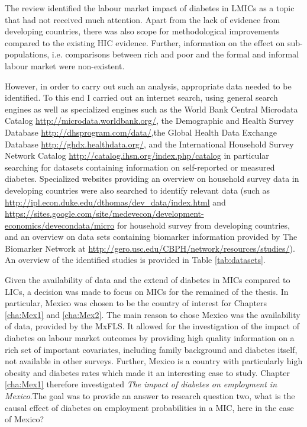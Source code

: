 The review identified the labour market impact of diabetes in \acp{LMIC} as a topic that had not received much attention. Apart from the lack of evidence from developing countries, there was also scope for methodological improvements compared to the existing \ac{HIC} evidence. Further, information on the effect on sub-populations, i.e. comparisons between rich and poor and the formal and informal labour market were non-existent.

However, in order to carry out such an analysis, appropriate data needed to be identified. To this end I carried out an internet search, using general search engines as well as specialized engines such as the World Bank Central Microdata Catalog  \url{http://microdata.worldbank.org/}, the Demographic and Health Survey Database \url{http://dhsprogram.com/data/},the Global Health Data Exchange Database \url{http://ghdx.healthdata.org/}, and the International Household Survey Network Catalog \url{http://catalog.ihsn.org/index.php/catalog} in particular searching for datasets containing information on self-reported or measured diabetes. Specialized websites providing an overview on household survey data in developing countries were also searched to identify relevant data (such as \url{http://ipl.econ.duke.edu/dthomas/dev_data/index.html} and \url{https://sites.google.com/site/medevecon/development-economics/devecondata/micro} for household survey from developing countries, and an overview on data sets containing biomarker information provided by The Biomarker Network at \url{http://gero.usc.edu/CBPH/network/resources/studies/}). An overview of the identified studies is provided in Table \ref{tab:datasets}.

Given the availability of data and the extend of diabetes in \acp{MIC} compared to \acp{LIC}, a decision was made to focus on \acp{MIC} for the remained of the thesis. In particular, Mexico was chosen to be the country of interest for Chapters \ref{cha:Mex1} and \ref{cha:Mex2}. The main reason to chose Mexico was the availability of data, provided by the \ac{MxFLS}. It allowed for the investigation of the impact of diabetes on labour market outcomes by providing high quality information on a rich set of important covariates, including family background and diabetes itself, not available in other surveys. Further, Mexico is a country with particularly high obesity and diabetes rates which made it an interesting case to study. Chapter \ref{cha:Mex1} therefore investigated \textit{The impact of diabetes on employment in Mexico}.The goal was to provide an answer to research question two, what is the causal effect of diabetes on employment probabilities in a \ac{MIC}, here in the case of Mexico?

